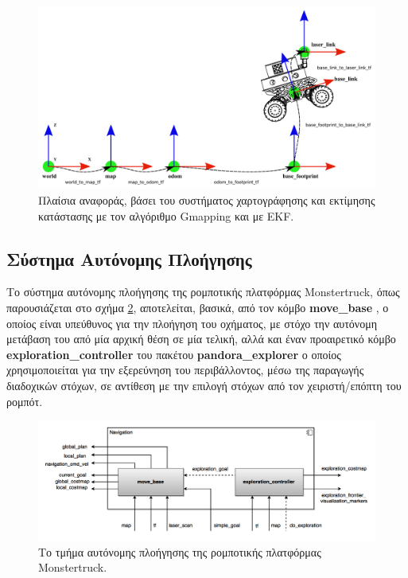 \begin{figure}[!ht]
	\centering
	\includegraphics[width=\linewidth]{Chapters/Chapter4/Figures/slam_2_reference_frames.png}
	\caption{Πλαίσια αναφοράς, βάσει του συστήματος χαρτογράφησης και εκτίμησης κατάστασης με τον αλγόριθμο Gmapping και με EKF.}
	\label{fig:slam_2_reference_frames}
\end{figure}

\subsection{Σύστημα Αυτόνομης Πλοήγησης} \label{ssec:navigation_system_architecture}
Το σύστημα αυτόνομης πλοήγησης της ρομποτικής πλατφόρμας Monstertruck, όπως παρουσιάζεται στο σχήμα \ref{fig:navigation_component_diagram}, αποτελείται, βασικά, από τον κόμβο \textbf{move{\_}base} \cite{move_base}, ο οποίος είναι υπεύθυνος για την πλοήγηση του οχήματος, με στόχο την αυτόνομη μετάβαση του από μία αρχική θέση σε μία τελική, αλλά και έναν προαιρετικό κόμβο \textbf{exploration{\_}controller} του πακέτου \textbf{pandora{\_}explorer} ο οποίος χρησιμοποιείται για την εξερεύνηση του περιβάλλοντος, μέσω της παραγωγής διαδοχικών στόχων, σε αντίθεση με την επιλογή στόχων από τον χειριστή/επόπτη του ρομπότ.

\begin{figure}[!ht]
	\centering
	\includegraphics[width=\linewidth]{Chapters/Chapter4/Figures/navigation_component_diagram.png}
	\caption{Το τμήμα αυτόνομης πλοήγησης της ρομποτικής πλατφόρμας Monstertruck.}
	\label{fig:navigation_component_diagram}
\end{figure}

